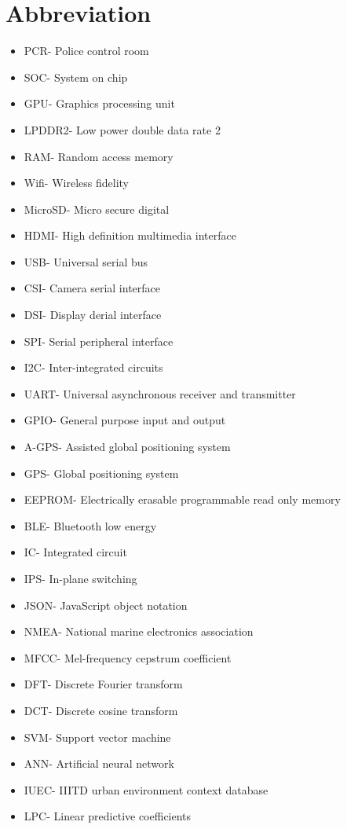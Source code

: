 \chapter*{Abbreviation}
\begin{itemize}
\item PCR- Police control room
\item SOC- System on chip
\item GPU- Graphics processing unit
\item LPDDR2- Low power double data rate 2
\item RAM- Random access memory
\item Wifi- Wireless fidelity
\item MicroSD- Micro secure digital
\item HDMI- High definition multimedia interface
\item USB- Universal serial bus
\item CSI- Camera serial interface
\item DSI- Display derial interface
\item SPI- Serial peripheral interface
\item I2C- Inter-integrated circuits
\item UART- Universal asynchronous receiver and transmitter
\item GPIO- General purpose input and output
\item A-GPS- Assisted global positioning system
\item GPS- Global positioning system
\item EEPROM- Electrically erasable programmable read only memory
\item BLE- Bluetooth low energy
\item IC- Integrated circuit
\item IPS- In-plane switching
\item JSON- JavaScript object notation
\item NMEA- National marine electronics association
\item MFCC- Mel-frequency cepstrum coefficient
\item DFT- Discrete Fourier transform
\item DCT- Discrete cosine transform
\item SVM- Support vector machine
\item ANN- Artificial neural network
\item IUEC- IIITD urban environment context database
\item LPC- Linear predictive coefficients

\end{itemize}
